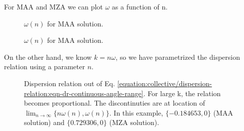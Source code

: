\documentclass[letterpaper,12pt,english]{sphinxmanual}
\begin{document}
For MAA and MZA we can plot \(\omega\) as a function of n.
\begin{figure}[htbp]
\centering
\capstart

\noindent{}
\caption{\(\omega(n)\) for MAA solution.}\label{\detokenize{collective/dispersion-relation:id8}}\end{figure}
\begin{figure}[htbp]
\centering
\capstart

\noindent{}
\caption{\(\omega(n)\) for MAA solution.}\label{\detokenize{collective/dispersion-relation:id9}}\end{figure}

On the other hand, we know \(k=n\omega\), so we have parametrized the dispersion relation using a parameter \(n\).
\begin{figure}[htbp]
\centering
\capstart

\noindent{}
\caption{Dispersion relation out of Eq. \eqref{equation:collective/dispersion-relation:eqn-dr-continuous-angle-range}. For large k, the relation becomes proportional. The discontinuties are at location of \(\lim_{n\to \infty}\{n\omega(n),\omega(n)\}\). In this example, \(\{ -0.184653, 0 \}\) (MAA solution) and \(\{  0.729306, 0 \}\) (MZA solution).}\label{\detokenize{collective/dispersion-relation:id10}}\end{figure}
\end{document}
